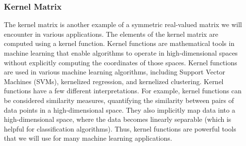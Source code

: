 \documentclass{article}[11pt]
\begin{document}
\subsubsection*{Kernel Matrix}
The kernel matrix is another example of a symmetric real-valued matrix we will encounter in various applications.
The elements of the kernel matrix are computed using a kernel function.
Kernel functions are mathematical tools in machine learning that enable algorithms to operate in high-dimensional spaces without explicitly computing the coordinates of those spaces.
Kernel functions are used in various machine learning algorithms, including Support Vector Machines (SVMs), kernelized regression, and kernelized clustering.
Kernel functions have a few different interpretations. 
For example, kernel functions can be considered similarity measures, quantifying the similarity between pairs of data points in a high-dimensional space.
They also implicitly map data into a high-dimensional space, where the data becomes linearly separable (which is helpful for classification algorithms).
Thus, kernel functions are powerful tools that we will use for many machine learning applications.
\end{document}
